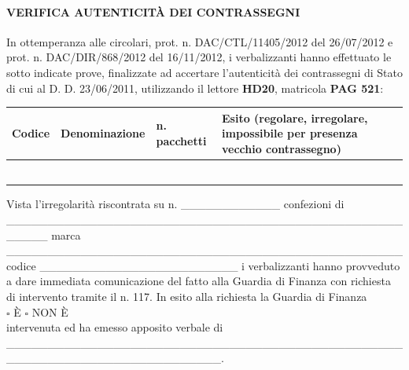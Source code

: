 \documentclass[12pt]{article}
\begin{document}
\paragraph{VERIFICA AUTENTICITÀ DEI CONTRASSEGNI} In ottemperanza alle circolari, prot. n. DAC/CTL/11405/2012 del 26/07/2012 e prot. n. DAC/DIR/868/2012 del 16/11/2012, i verbalizzanti hanno effettuato le sotto indicate prove, finalizzate ad accertare l’autenticità dei contrassegni di Stato di cui al D. D. 23/06/2011, utilizzando il lettore \textbf{HD20}, matricola \textbf{PAG 521}:

\begin{tabularx}{\textwidth}{|p{}|p{}|p{}|Y|}
    \hline
    Codice & Denominazione & n. pacchetti & Esito (regolare, irregolare, impossibile per presenza vecchio contrassegno)  \\
    \hline
     & & & \\[20pt]
    \hline
     & & & \\[20pt]
    \hline
     & & & \\[20pt]
    \hline
     & & & \\[20pt]
    \hline
     & & & \\[20pt]
    \hline
     & & & \\[20pt]
    \hline
\end{tabularx}

Vista l’irregolarità riscontrata su n. \_\_\_\_\_\_\_\_\_\_\_\_ confezioni di \_\_\_\_\_\_\_\_\_\_\_\_\_\_\_\_\_\_\_\_\_\_\_\_\_\_\_\_\_\_\_\_\_\_\_\_\_\_\_\_\_\_\_\_\_\_\_\_\_\_\_\_\_ marca \_\_\_\_\_\_\_\_\_\_\_\_\_\_\_\_\_\_\_\_\_\_\_\_\_\_\_\_\_\_\_\_\_\_\_\_\_\_\_\_\_\_\_\_\_\_\_\_ codice  \_\_\_\_\_\_\_\_\_\_\_\_\_\_\_\_\_\_\_\_\_\_\_\_ i verbalizzanti hanno provveduto a dare immediata comunicazione  del fatto alla Guardia di Finanza con richiesta di intervento tramite il n. 117.  In esito alla richiesta la Guardia di Finanza \\
\begin{math}\square\end{math} È \begin{math}\square\end{math} NON È\\
intervenuta ed ha emesso apposito verbale  di \_\_\_\_\_\_\_\_\_\_\_\_\_\_\_\_\_\_\_\_\_\_\_\_\_\_\_\_\_\_\_\_\_\_\_\_\_\_\_\_\_\_\_\_\_\_\_\_\_\_\_\_\_\_\_\_\_\_\_\_\_\_\_\_\_\_\_\_\_\_\_\_\_\_.
\end{document}
